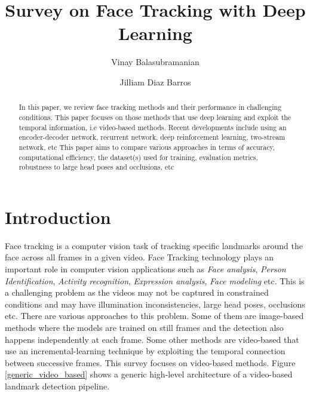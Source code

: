 \documentclass{llncs}
\begin{document}
\pagestyle{headings}  %

%
\title{Survey on Face Tracking with Deep Learning}
%
%
\author{Vinay Balasubramanian \and Jilliam Diaz Barros}
%
%

\maketitle              %

\begin{abstract}
In this paper, we review face tracking methods and their performance in challenging conditions. This paper focuses on those methods that use deep learning and exploit the temporal information, i.e video-based methods. Recent developments include using an encoder-decoder network, recurrent network, deep reinforcement learning, two-stream network, etc This paper aims to compare various approaches in terms of accuracy, computational efficiency, the dataset(s) used for training, evaluation metrics, robustness to large head poses and occlusions, etc
\end{abstract}


\section{Introduction}
Face tracking is a computer vision task of tracking specific landmarks around the face across all frames in a given video.
Face Tracking technology plays an important role in computer vision applications such as \textit{Face analysis}, \textit{Person Identification}, \textit{Activity recognition}, \textit{Expression analysis}, \textit{Face modeling} etc. This is a challenging problem as the videos may not be captured in constrained conditions and may have illumination inconsistencies, large head poses, occlusions etc.
There are various approaches to this problem. Some of them are image-based methods where the models are trained on still frames and the detection also happens independently at each frame. Some other methods are video-based that use an incremental-learning technique by exploiting the temporal connection between successive frames. This survey focuses on video-based methods. Figure \ref{generic_video_based} shows a generic high-level architecture of a video-based landmark detection pipeline.
\end{document}
